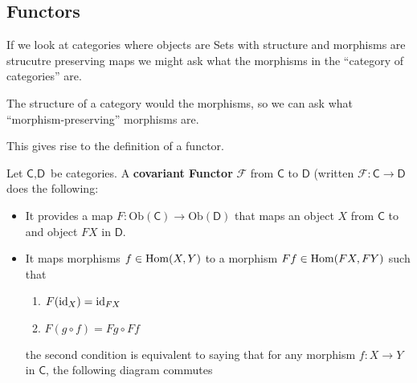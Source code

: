\subsection{Functors}
If we look at categories where objects are Sets with structure and morphisms are strucutre preserving maps we might ask what the morphisms in the ``category of categories'' are.

The structure of a category would the morphisms, so we can ask what ``morphism-preserving'' morphisms are.

This gives rise to the definition of a functor.

\begin{dfn}[]
  Let $\textsf{C},\textsf{D}$ be categories. A \textbf{covariant Functor} $\mathcal{F}$ from $\textsf{C}$ to $\textsf{D}$ (written $\mathcal{F}: \textsf{C} \to  \textsf{D}$ does the following:

  \begin{itemize}
    \item It provides a map $F: \text{Ob}(\textsf{C}) \to  \text{Ob}(\textsf{D})$ that maps an object $X$ from $\textsf{C}$ to and object $F X$ in $\textsf{D}$.
    \item It maps morphisms $f \in \operatorname{Hom}(X,Y)$ to a morphism $F f \in \operatorname{Hom}(F X, F Y)$ such that
      \begin{enumerate}[{(}i{)}]
        \item $F (\operatorname{id}_X) = \operatorname{id}_{F X}$
        \item $F (g \circ f) = Fg \circ Ff$
      \end{enumerate}
      the second condition is equivalent to saying that for any morphism $f: X \to  Y$ in $\textsf{C}$, the following diagram commutes
\begin{center}
\end{center}
  \end{itemize}
\end{dfn}



